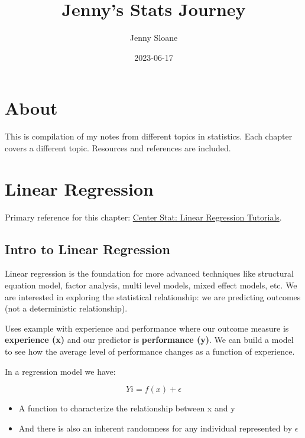\documentclass[
]{book}
\title{Jenny's Stats Journey}
\author{Jenny Sloane}
\date{2023-06-17}
\providecommand{\tightlist}{%
  \setlength{\itemsep}{0pt}\setlength{\parskip}{0pt}}
\begin{document}
\maketitle

{
\setcounter{tocdepth}{1}
\tableofcontents
}
\hypertarget{about}{%
\chapter{About}\label{about}}

This is compilation of my notes from different topics in statistics. Each chapter covers a different topic. Resources and references are included.

\hypertarget{linear-regression}{%
\chapter{Linear Regression}\label{linear-regression}}

Primary reference for this chapter: \href{https://www.youtube.com/playlist?list=PLQGe6zcSJT0V4xC1NDyQePkyxUj8LWLnD}{Center Stat: Linear Regression Tutorials}.

\hypertarget{intro-to-linear-regression}{%
\section{Intro to Linear Regression}\label{intro-to-linear-regression}}

Linear regression is the foundation for more advanced techniques like structural equation model, factor analysis, multi level models, mixed effect models, etc. We are interested in exploring the statistical relationship: we are predicting outcomes (not a deterministic relationship).

Uses example with experience and performance where our outcome measure is \textbf{experience (x)} and our predictor is \textbf{performance (y)}. We can build a model to see how the average level of performance changes as a function of experience.

In a regression model we have:

\[
Yi = f(x) + \epsilon
\]

\begin{itemize}
\tightlist
\item
  A function to characterize the relationship between x and y
\item
  And there is also an inherent randomness for any individual represented by \(\epsilon\)
\end{itemize}
\end{document}
